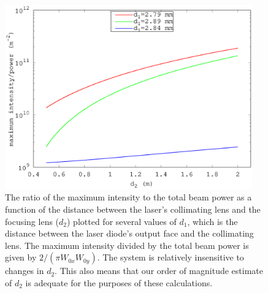 \begin{figure}
    \centerline{\includegraphics[width=0.95\textwidth]{waists1.eps}}
    \caption[]{\label{waists1} The ratio of the maximum intensity to the total beam power as a function of the distance between the laser's collimating lens and the focusing lens ($d_2$) plotted for several values of $d_1$, which is the distance between the laser diode's output face and the collimating lens. The maximum intensity divided by the total beam power is given by $2/(\pi W_{0x}W_{0y})$. The system is relatively insensitive to changes in $d_2$. This also means that our order of magnitude estimate of $d_2$ is adequate for the purposes of these calculations.} 
\end{figure}

